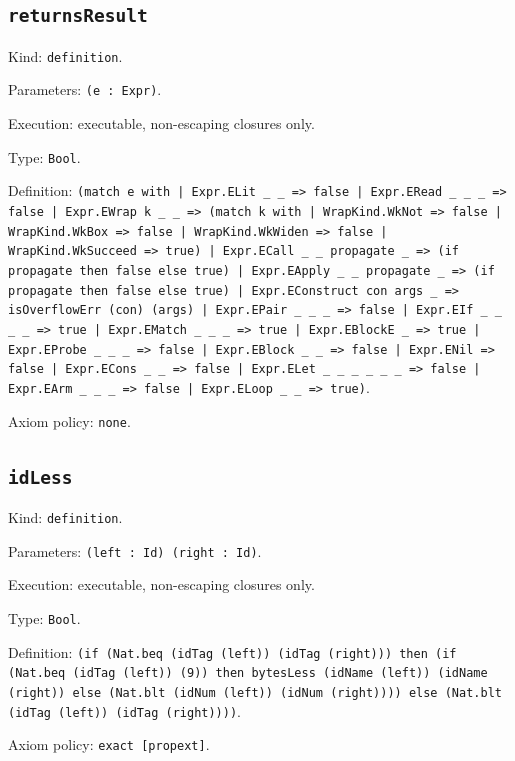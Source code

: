 \documentclass[11pt]{article}
\begin{document}
\subsection*{\texttt{returnsResult}}
\noindent Kind: \texttt{definition}.\par
\noindent Parameters: \texttt{(e : Expr)}.\par
\noindent Execution: executable, non-escaping closures only.\par
\noindent Type: \texttt{Bool}.\par
\noindent Definition: \texttt{(match e with | Expr.ELit \_ \_ => false | Expr.ERead \_ \_ \_ => false | Expr.EWrap k \_ \_ => (match k with | WrapKind.WkNot => false | WrapKind.WkBox => false | WrapKind.WkWiden => false | WrapKind.WkSucceed => true) | Expr.ECall \_ \_ propagate \_ => (if propagate then false else true) | Expr.EApply \_ \_ propagate \_ => (if propagate then false else true) | Expr.EConstruct con args \_ => isOverflowErr (con) (args) | Expr.EPair \_ \_ \_ => false | Expr.EIf \_ \_ \_ \_ => true | Expr.EMatch \_ \_ \_ => true | Expr.EBlockE \_ => true | Expr.EProbe \_ \_ \_ => false | Expr.EBlock \_ \_ => false | Expr.ENil => false | Expr.ECons \_ \_ => false | Expr.ELet \_ \_ \_ \_ \_ \_ => false | Expr.EArm \_ \_ \_ => false | Expr.ELoop \_ \_ => true)}.\par
\noindent Axiom policy: \texttt{none}.\par
\subsection*{\texttt{idLess}}
\noindent Kind: \texttt{definition}.\par
\noindent Parameters: \texttt{(left : Id) (right : Id)}.\par
\noindent Execution: executable, non-escaping closures only.\par
\noindent Type: \texttt{Bool}.\par
\noindent Definition: \texttt{(if (Nat.beq (idTag (left)) (idTag (right))) then (if (Nat.beq (idTag (left)) (9)) then bytesLess (idName (left)) (idName (right)) else (Nat.blt (idNum (left)) (idNum (right)))) else (Nat.blt (idTag (left)) (idTag (right))))}.\par
\noindent Axiom policy: \texttt{exact [propext]}.\par
\end{document}
